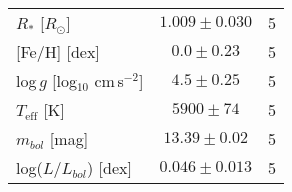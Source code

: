 \documentclass{aa}
\newcommand{\asas}{ASASSN-21qj}
\newcommand{\teff}{$T_\mathrm{eff}$}
\newcommand{\rsun}{$R_\odot$}
\begin{document}
\begin{table}
\begin{tabular}{@{}lcc@{}}
        \hline
         $R_*$ [\rsun{}]                        & $1.009\pm0.030$           & 5     \\
         {[}Fe/H{]} [dex]                       & $0.0\pm0.23$               & 5     \\
         log\,$g$ [log$_{10}$ cm\,s$^{-2}$]     & $4.5\pm0.25$               & 5     \\
         \teff{} [K]                            & $5900\pm74$               & 5     \\
         $m_{bol}$ [mag]                        & $13.39\pm0.02$           & 5     \\
         log($L/L_{bol}$) [dex]                 & $0.046\pm0.013$        & 5     \\
         
        \hline
    \end{tabular}
    \label{tab:Stellarprop}
\end{table}



\end{document}

